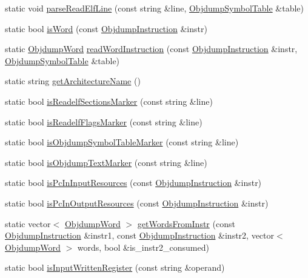 \begin{DoxyCompactItemize}
static void \hyperlink{classArch_a76f94b5b6ae95117c9f50eb239c8b1f6}{parse\+Read\+Elf\+Line} (const string \&line, \hyperlink{classObjdumpSymbolTable}{Objdump\+Symbol\+Table} \&table)
\item 
static bool \hyperlink{classArch_aae45fad85b266ebdddeca74db6dc7757}{is\+Word} (const \hyperlink{classObjdumpInstruction}{Objdump\+Instruction} \&instr)
\item 
static \hyperlink{classObjdumpWord}{Objdump\+Word} \hyperlink{classArch_ae31c680981598a1b57f5f0cddd211e9d}{read\+Word\+Instruction} (const \hyperlink{classObjdumpInstruction}{Objdump\+Instruction} \&instr, \hyperlink{classObjdumpSymbolTable}{Objdump\+Symbol\+Table} \&table)
\item 
static string \hyperlink{classArch_a55683507cebf0818b780a01b537b3338}{get\+Architecture\+Name} ()
\item 
static bool \hyperlink{classArch_a76615e9f0fe6fee36d6bc97055ce5d69}{is\+Readelf\+Sections\+Marker} (const string \&line)
\item 
static bool \hyperlink{classArch_a84e4dcaf28bf07bfb13486a36f303e4b}{is\+Readelf\+Flags\+Marker} (const string \&line)
\item 
static bool \hyperlink{classArch_a0c35ca4d2805a080172f6c172762abe6}{is\+Objdump\+Symbol\+Table\+Marker} (const string \&line)
\item 
static bool \hyperlink{classArch_a1812a3a694bb2ee08f2d20a68e0796aa}{is\+Objdump\+Text\+Marker} (const string \&line)
\item 
static bool \hyperlink{classArch_afd6a6932c55aa195196b2c08936e4696}{is\+Pc\+In\+Input\+Resources} (const \hyperlink{classObjdumpInstruction}{Objdump\+Instruction} \&instr)
\item 
static bool \hyperlink{classArch_ae9c76e4a1181bc72d5babaac8a0521cf}{is\+Pc\+In\+Output\+Resources} (const \hyperlink{classObjdumpInstruction}{Objdump\+Instruction} \&instr)
\item 
static vector$<$ \hyperlink{classObjdumpWord}{Objdump\+Word} $>$ \hyperlink{classArch_aab44c957bca6c160dbd3638fc03220cd}{get\+Words\+From\+Instr} (const \hyperlink{classObjdumpInstruction}{Objdump\+Instruction} \&instr1, const \hyperlink{classObjdumpInstruction}{Objdump\+Instruction} \&instr2, vector$<$ \hyperlink{classObjdumpWord}{Objdump\+Word} $>$ words, bool \&is\+\_\+instr2\+\_\+consumed)
\item 
static bool \hyperlink{classArch_a804449edaaff729eb0b796b6854f3a58}{is\+Input\+Written\+Register} (const string \&operand)
\item 

\end{DoxyCompactItemize}
